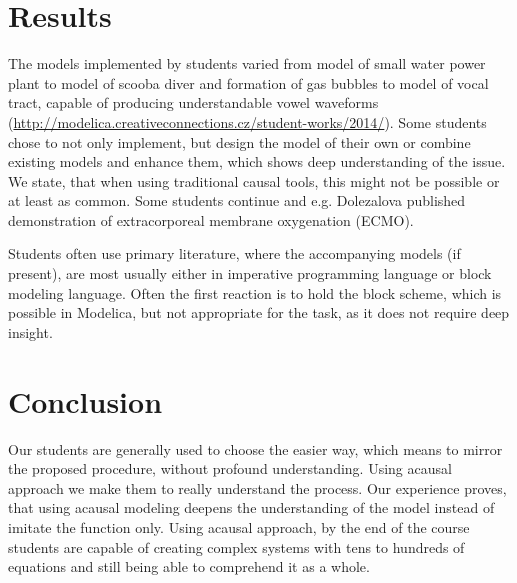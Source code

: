 \documentclass[letterpaper, 10 pt, conference]{ieeeconf}  %
\begin{document}

\section{Results}
The models implemented by students varied from model of small water power plant to model of scooba diver and formation of gas bubbles to model of vocal tract, capable of producing understandable vowel waveforms (\url{http://modelica.creativeconnections.cz/student-works/2014/}). Some students chose to not only implement, but design the model of their own or combine existing models and enhance them, which shows deep understanding of the issue. We state, that when using traditional causal tools, this might not be possible or at least as common. Some students continue and e.g. Dolezalova published demonstration of extracorporeal membrane oxygenation (ECMO)\cite{dolezalova2014}.

Students often use primary literature, where the accompanying models (if present), are most usually either in imperative programming language or block modeling language. Often the first reaction is to hold the block scheme, which is possible in Modelica, but not appropriate for the task, as it does not require deep insight. %





\section{Conclusion}

Our students are generally used to choose the easier way, which means to mirror the proposed procedure, without profound understanding. Using acausal approach we make them to really understand the process. Our experience proves, that using acausal modeling deepens the understanding of the model instead of imitate the function only. Using acausal approach, by the end of the course students are capable of creating complex systems with tens to hundreds of equations and still being able to comprehend it as a whole. 





\end{document}
